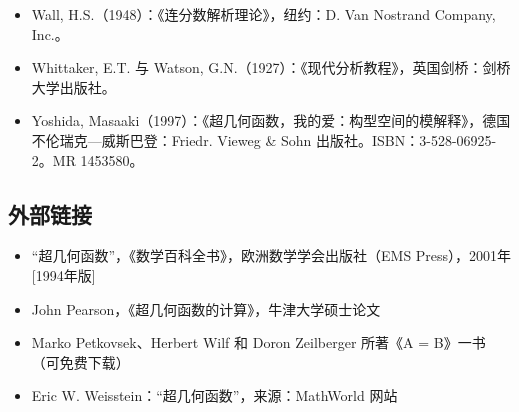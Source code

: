 \begin{itemize}
\item Wall, H.S.（1948）：《连分数解析理论》，纽约：D. Van Nostrand Company, Inc.。
\item Whittaker, E.T. 与 Watson, G.N.（1927）：《现代分析教程》，英国剑桥：剑桥大学出版社。
\item Yoshida, Masaaki（1997）：《超几何函数，我的爱：构型空间的模解释》，德国不伦瑞克—威斯巴登：Friedr. Vieweg & Sohn 出版社。ISBN：3-528-06925-2。MR 1453580。
\end{itemize}
\subsection{外部链接}
\begin{itemize}
\item “超几何函数”，《数学百科全书》，欧洲数学学会出版社（EMS Press），2001年 [1994年版]
\item John Pearson，《超几何函数的计算》，牛津大学硕士论文
\item Marko Petkovsek、Herbert Wilf 和 Doron Zeilberger 所著《A = B》一书（可免费下载）
\item Eric W. Weisstein：“超几何函数”，来源：MathWorld 网站
\end{itemize}
